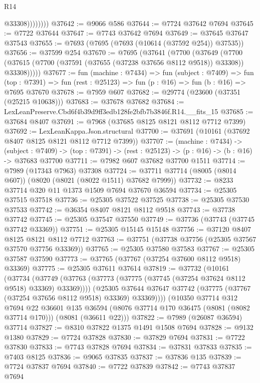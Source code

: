 \begin{lexlean}{R14}
\begin{coremodule}
                    @33308))))))))
@37642 := @9066 @586
@37644 := @7724 @37642 @7694
@37645 := @7722 @37644
@37647 := @7743 @37642 @7694
@37649 := @37645 @37647 @37543
@37655 := @7693 (@7695 (@7693 (@10614 (@37592 @254)) @37535))
@37656 := @37599 @254
@37670 := @7695
    (@37641
      (@7700
        (@37649
          (@7700 (@37615 (@7700 (@37591 (@37655 (@37238 @37656 @8112 @9518)) @33308)) @33308)))))
@37677 := fun (machine : @7434) =>
  fun (subject : @7409) =>
  fun (top : @7391) => fun (rest : @25123) => fun (p : @16) => fun (b : @16) => @7695 @37670
@37678 := @7959 @607
@37682 := @29774 (@23600 (@37351 (@25215 @10638)))
@37683 := @37678 @37682
@37684 := LexLeanPreserve.Cbd6f4b39d9ff3edb128fe2bfb7b3846f.R14.__fits_15
@37685 := @37684 @8407
@37691 := @7968 (@37685 @8125 @8121 @8112 @7712 @7399)
@37692 := LexLeanKappa.Json.structural
@37700 := @37691 (@10161 (@37692 @8407 @8125 @8121 @8112 @7712 @7399))
@37707 := (machine : @7434) ->
  (subject : @7409) -> (top : @7391) -> (rest : @25123) -> (p : @16) -> (b : @16) -> @37683 @37700
@37711 := @7982 @607 @37682 @37700 @1511
@37714 := @7989 (@17343 @7963) @37308
@37724 := @37711 @37714 (@8005 (@8014 @607)) (@8020 (@8021 (@8022 @1511) @37682 @7999))
@37732 := @8233 @37714 @320 @11 @1373 @1509 @7694 @37670 @36594
@37734 := @25305 @37515 @37518
@37736 := @25305 @37522 @37525
@37738 := @25305 @37530 @37533
@37742 := @36354 @8407 @8121 @8112 @9518
@37743 := @37738 @37742
@37745 := @25305 @37547 @37550
@37749 := @37736 (@37743 (@37745 @37742 @33369))
@37751 := @25305 @15145 @15148
@37756 := @37120 @8407 @8125 @8121 @8112 @7712
@37763 := @37751 (@37738 @37756 (@25305 @37567 @37570 @37756 @33369))
@37765 := @25305 @37580 @37583
@37767 := @25305 @37587 @37590
@37773 := @37765 (@37767 (@37254 @37600 @8112 @9518) @33369)
@37775 := @25305 @37611 @37614
@37819 := @37732
    (@10161
      (@37734
        (@37749 (@37763 (@37773 (@37775 (@37745 (@37254 @37624 @8112 @9518) @33369) @33369))))
        (@25305 @37644 @37647 @37742 (@37775 (@37767 (@37254 @37656 @8112 @9518) @33369) @33369))))
    (@10350
      @37714
      @312
      @7694
      @22
      @36601
      @135
      @36594
      (@8076 @37714 @170 @36475 (@8081 (@8082 @37714 @170)))
      (@8081 (@36611 @22)))
@37822 := @7989 (@26087 @36594) @37714
@37827 := @8310 @37822 @1375 @1491 @1508 @7694
@37828 := @9132 @1380
@37829 := @7724 @37828
@37830 := @37829 @7694
@37831 := @7722 @37830
@37833 := @7743 @37828 @7694
@37834 := @37831 @37833
@37835 := @7403 @8125
@37836 := @9065 @37835
@37837 := @37836 @135
@37839 := @7724 @37837 @7694
@37840 := @7722 @37839
@37842 := @7743 @37837 @7694

\end{coremodule}
\end{lexlean}
